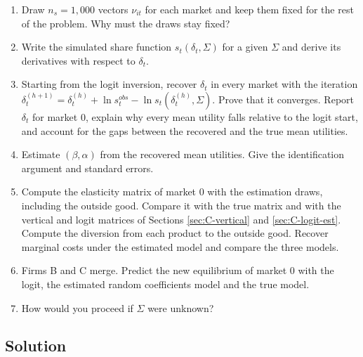 \begin{enumerate}[label=(\alph*)]
  \item Draw $n_s = 1{,}000$ vectors $\nu_{it}$ for each market and keep them fixed for the rest of the problem. Why
  must the draws stay fixed?
  \item Write the simulated share function $s_t(\delta_t, \Sigma)$ for a given $\Sigma$ and derive its derivatives
  with respect to $\delta_t$.
  \item Starting from the logit inversion, recover $\delta_t$ in every market with the iteration
  $\delta^{(h+1)}_t = \delta^{(h)}_t + \ln s^{obs}_t - \ln s_t(\delta^{(h)}_t, \Sigma)$. Prove that it converges. Report
  $\delta_t$ for market 0, explain why every mean utility falls relative to the logit start, and account for the gaps
  between the recovered and the true mean utilities.
  \item Estimate $(\beta, \alpha)$ from the recovered mean utilities. Give the identification argument and standard
  errors.
  \item Compute the elasticity matrix of market 0 with the estimation draws, including the outside good. Compare it
  with the true matrix and with the vertical and logit matrices of Sections \ref{sec:C-vertical} and
  \ref{sec:C-logit-est}. Compute the diversion from each product to the outside good. Recover marginal costs under the
  estimated model and compare the three models.
  \item Firms B and C merge. Predict the new equilibrium of market 0 with the logit, the estimated random coefficients
  model and the true model.
  \item How would you proceed if $\Sigma$ were unknown?
\end{enumerate}

\subsection{Solution}

